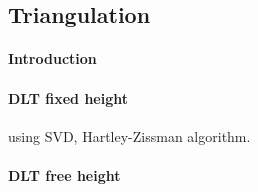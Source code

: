 \subsection{Triangulation}

\paragraph{Introduction}

\paragraph{DLT fixed height} 
using SVD, Hartley-Zissman algorithm. 

\paragraph{DLT free height}


%	
%	
